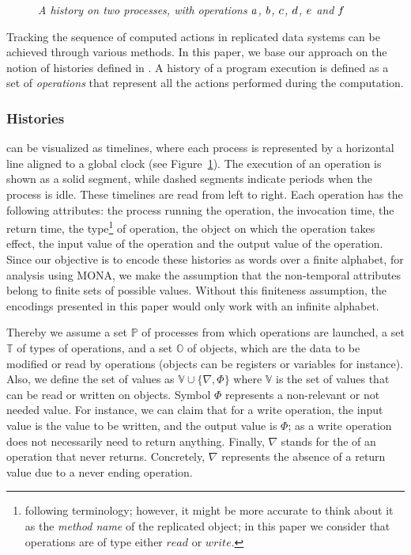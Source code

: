 
\begin{figure}[t]
\begin{center}
\resizebox{0.5\textwidth}{!}{

}
\end{center}
\caption{\small \slshape A history on two processes, with operations $a$, $b$, $c$, $d$, $e$ and $f$}
\label{fig:ex-history}
\end{figure}


Tracking the sequence of computed actions in replicated data systems can be achieved through various methods. In this paper, we base our approach on the notion of histories defined in \cite{ViottiVukolic}. A history of a program execution is defined as a set of \textsl{operations} that represent all the actions performed during the computation. 

\subsubsection{Histories} can be visualized as timelines, where each process is represented by a horizontal line aligned to a global clock (see Figure~\ref{fig:ex-history}). The execution of an operation is shown as a solid segment, while dashed segments indicate periods when the process is idle. These timelines are read from left to right. 
 Each operation has the following attributes: the process running the operation, the invocation time, the return time, the type\footnote{following \cite{ViottiVukolic} terminology; however, it might be more accurate to think about it as the \emph{method name} of the replicated object; in this paper we consider that operations are of type either $read$ or $write$.} of operation, the object on which the operation takes effect, the input value of the operation and the output value of the operation. 
Since our objective is to encode these histories as words over a finite alphabet, for analysis using MONA, we make the assumption that the non-temporal attributes belong to finite sets of possible values. Without this finiteness assumption, the encodings presented in this paper would only work with an infinite alphabet.

Thereby we assume a set $\mathbb{P}$ of processes from which operations are launched, a set $\mathbb{T}$ of types of operations, and a set $\mathbb{O}$ of objects, which are the data to be modified or read by operations (objects can be registers or variables for instance). Also, we define the set of values as $\mathbb{V}\cup\{\nabla,\Phi\}$ where $\mathbb{V}$ is the set of values that can be read or written on objects. Symbol $\Phi$ represents a non-relevant or not needed value. For instance, we can claim that for a write operation, the input value is the value to be written, and the output value is $\Phi$; as a write operation does not necessarily need to return anything. Finally, $\nabla$ stands for the  of an operation that never returns. Concretely, $\nabla$ represents the absence of a return value due to a never ending operation. 


